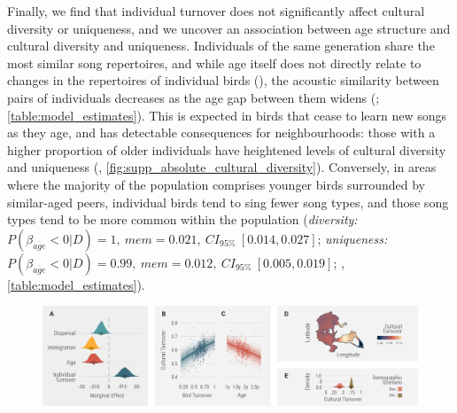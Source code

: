 \documentclass[9pt, onecolumn, twoside, lineno]{gsajnl}
\begin{document}
Finally, we find that individual turnover does not significantly affect cultural diversity or uniqueness, and we uncover an association between age structure and cultural diversity and uniqueness. Individuals of the same generation share the most similar song repertoires, and while age itself does not directly relate to changes in the repertoires of individual birds (), the acoustic similarity between pairs of individuals decreases as the age gap between them widens (; \autoref{table:model_estimates}). This is expected in birds that cease to learn new songs as they age, and has detectable consequences for neighbourhoods: those with a higher proportion of older individuals have heightened levels of cultural diversity and uniqueness (, \autoref{fig:supp_absolute_cultural_diversity}). Conversely, in areas where the majority of the population comprises younger birds surrounded by similar-aged peers, individual birds tend to sing fewer song types, and those song types tend to be more common within the population (\textit{diversity:} $P(\beta_{\overline{age}} < 0 | D) = 1,~mem=0.021,~CI_{95\%}~[0.014, 0.027]$; \textit{uniqueness:} $P(\beta_{\overline{age}} < 0 | D) = 0.99,~mem=0.012,~CI_{95\%}~[0.005, 0.019]$; , \autoref{table:model_estimates}).

\begin{figure}[!htb]
    \centering
    \includegraphics[width=\linewidth]{figures/chapter_4/FIG4.pdf}
    \label{c4_fig:turnover}
\end{figure}
\end{document}
